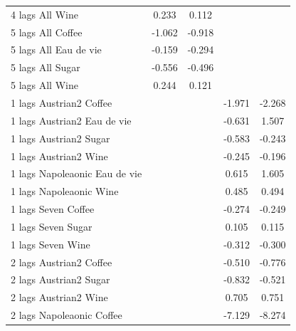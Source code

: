 \documentclass[12pt,a4paper,titlepage]{article}
\begin{document}
{\begin{longtable}{l*{4}{c}}
4 lags All Wine     &       0.233         &       0.112         &                     &                     \\
5 lags All Coffee   &      -1.062\sym{***}&      -0.918\sym{***}&                     &                     \\
5 lags All Eau de vie&      -0.159         &      -0.294         &                     &                     \\
5 lags All Sugar    &      -0.556\sym{**} &      -0.496\sym{***}&                     &                     \\
5 lags All Wine     &       0.244         &       0.121         &                     &                     \\
1 lags Austrian2 Coffee&                     &                     &      -1.971\sym{***}&      -2.268\sym{***}\\
1 lags Austrian2 Eau de vie&                     &                     &      -0.631         &       1.507         \\
1 lags Austrian2 Sugar&                     &                     &      -0.583\sym{***}&      -0.243         \\
1 lags Austrian2 Wine&                     &                     &      -0.245         &      -0.196         \\
1 lags Napoleaonic Eau de vie&                     &                     &       0.615         &       1.605         \\
1 lags Napoleaonic Wine&                     &                     &       0.485         &       0.494         \\
1 lags Seven Coffee &                     &                     &      -0.274\sym{*}  &      -0.249\sym{*}  \\
1 lags Seven Sugar  &                     &                     &       0.105         &       0.115         \\
1 lags Seven Wine   &                     &                     &      -0.312\sym{*}  &      -0.300\sym{**} \\
2 lags Austrian2 Coffee&                     &                     &      -0.510\sym{**} &      -0.776\sym{***}\\
2 lags Austrian2 Sugar&                     &                     &      -0.832\sym{***}&      -0.521         \\
2 lags Austrian2 Wine&                     &                     &       0.705\sym{**} &       0.751\sym{**} \\
2 lags Napoleaonic Coffee&                     &                     &      -7.129\sym{***}&      -8.274\sym{***}\\

\end{longtable}}
\end{document}
